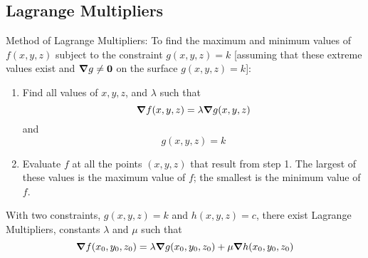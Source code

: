 \documentclass{article}
\begin{document}
    \subsection{Lagrange Multipliers}
    \begin{outline}
        \1 Method of Lagrange Multipliers: To find the maximum and minimum values of \(f(x,y,z)\) subject to the constraint \(g(x,y,z)=k\) [assuming that these extreme values exist and \(\grad{g}\neq \vb{0}\) on the surface \(g(x,y,z)=k\)]: 
        \begin{enumerate}
            \item Find all values of \(x,y,z\), and \(\lambda\) such that \[\grad f(x,y,z)=\lambda\grad g(x,y,z)\] and \[g(x,y,z)=k\]
            \item Evaluate $f$ at all the points \((x,y,z)\) that result from step 1. The largest of these values is the maximum value of $f$; the smallest is the minimum value of $f$. 
        \end{enumerate}
        \1 With two constraints, \(g(x,y,z)=k\) and \(h(x,y,z)=c\), there exist Lagrange Multipliers, constants \(\lambda\) and \(\mu\) such that \[\grad f(x_0,y_0,z_0)=\lambda\grad g(x_0,y_0,z_0)+\mu\grad h(x_0,y_0,z_0)\]
    \end{outline}
\end{document}

